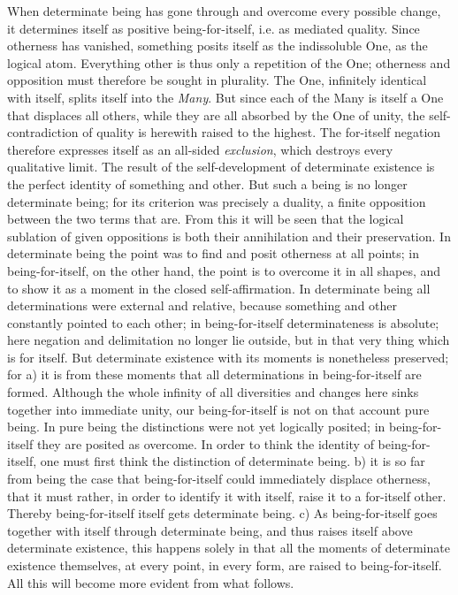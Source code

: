 \documentclass[12pt,a4paper,openany]{book}
\newcommand{\opage}[1]{\marginnote{\footnotesize\textit{[#1]}}}
\begin{document}
When determinate being has gone through and overcome
every possible change, it determines itself
as positive being-for-itself, i.e. as mediated
quality. Since otherness has vanished,
something posits itself as the indissoluble One, as the
logical atom. Everything other is thus only a repetition
of the One; otherness and opposition must
therefore be sought in plurality. The One, infinitely
identical with itself, splits itself into the \emph{Many}. But
since each of the Many is itself a One that displaces
all others, while they are all absorbed by the One
of unity, the self-contradiction of quality is herewith
raised to the highest. The for-itself negation
therefore expresses itself as an all-sided \emph{exclusion},
which destroys every qualitative limit.
 The result of the self-development of determinate existence is the perfect identity of something and other. But such a being is no longer determinate being; for its criterion was precisely a duality, a finite opposition between the two terms that are. From this it will
\setcounter{footnote}{0}%
\opage{15}be seen that the logical sublation of given oppositions
is both their annihilation and their preservation.
In determinate being the point was to find and posit
otherness at all points; in being-for-itself, on the other hand,
the point is to overcome it in all shapes,
and to show it as a moment in the closed self-affirmation.
In determinate being all determinations were external
and relative, because something and other constantly pointed
to each other; in being-for-itself determinateness is absolute; here negation and delimitation
no longer lie outside, but in that very thing which is
for itself. But determinate existence with its moments is nonetheless
preserved; for a) it is from these moments that all determinations in being-for-itself are formed.
Although the whole infinity of all diversities and changes
here sinks together into immediate unity,
our being-for-itself is not on that account pure being.
In pure being the distinctions were not yet
logically posited; in being-for-itself they are posited as
overcome. In order to think the identity of being-for-itself, one must first think the distinction of determinate being.
b) it is so far from being the case that being-for-itself could immediately displace otherness, that it must rather,
in order to identify it with itself, raise
it to a for-itself other. Thereby
being-for-itself itself gets determinate being. c) As being-for-itself
goes together with itself through determinate being, and
thus raises itself above determinate existence, this happens
solely in that all the moments of determinate existence themselves, at
every point, in every form, are raised to being-for-itself.
All this will become more
evident from what follows.
\end{document}
